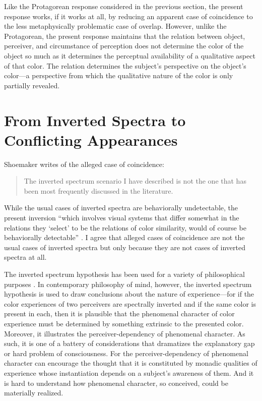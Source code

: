 \documentclass[12pt]{article}
\begin{document}
Like the Protagorean response considered in the previous section, the present response works, if it works at all, by reducing an apparent case of coincidence to the less metaphysically problematic case of overlap. However, unlike the Protagorean, the present response maintains that the relation between object, perceiver, and circumstance of perception does not determine the color of the object so much as it determines the perceptual availability of a qualitative aspect of that color. The relation determines the subject's perspective on the object's color---a perspective from which the qualitative nature of the color is only partially revealed.


\section{From Inverted Spectra to Conflicting Appearances}\label{sec:conclusion}


Shoemaker writes of the alleged case of coincidence: 
\begin{quote}
	The inverted spectrum scenario I have described is not the one that has been most frequently discussed in the literature. \citep[270]{Shoemaker:wk} 
\end{quote}
While the usual cases of inverted spectra are behaviorally undetectable, the present inversion ``which involves visual systems that differ somewhat in the relations they `select' to be the relations of color similarity, would of course be behaviorally detectable'' \citep[270]{Shoemaker:wk}. I agree that alleged cases of coincidence are not the usual cases of inverted spectra but only because they are not cases of inverted spectra at all.

The inverted spectrum hypothesis has been used for a variety of philosophical purposes \citep[see][for some of these]{Byrne:2005ve}. In contemporary philosophy of mind, however, the inverted spectrum hypothesis is used to draw conclusions about the nature of experience---for if the color experiences of two perceivers are spectrally inverted and if the same color is present in each, then it is plausible that the phenomenal character of color experience must be determined by something extrinsic to the presented color. Moreover, it illustrates the perceiver-dependency of phenomenal character. As such, it is one of a battery of considerations that dramatizes the explanatory gap or hard problem of consciousness. For the perceiver-dependency of phenomenal character can encourage the thought that it is constituted by monadic qualities of experience whose instantiation depends on a subject's awareness of them. And it is hard to understand how phenomenal character, so conceived, could be materially realized.
\end{document}
